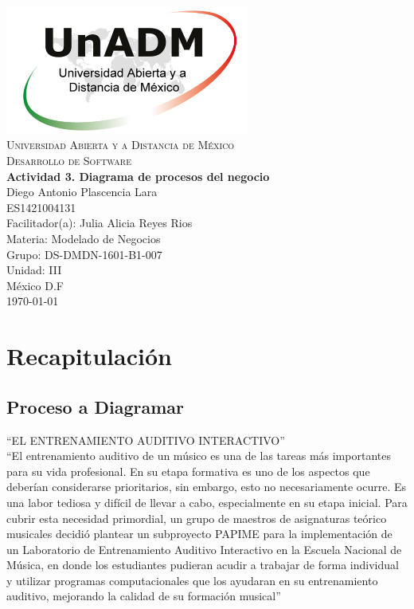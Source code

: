 \documentclass[spanish,12pt,letterpapper]{article}
\begin{document}
	\begin{titlepage}
		\begin{center}
			\includegraphics[width=0.6\textwidth]{../logoUnADM}~\\[1cm] 
			\textsc{Universidad Abierta y a Distancia de México}\\[0.8cm]
			\textsc{Desarrollo de Software}\\[1.8cm]
			
			\textbf{ \Large Actividad 3. Diagrama de procesos del negocio}\\[3cm]
			
			Diego Antonio Plascencia Lara\\ ES1421004131 \\[0.4cm]
			Facilitador(a): Julia Alicia Reyes Rios\\
			Materia: Modelado de Negocios\\
			Grupo: DS-DMDN-1601-B1-007 \\
			Unidad: III \\
			
			\vfill México D.F\\{\today}
			
		\end{center}
	\end{titlepage}
	
	\section{Recapitulación}
	\subsection{Proceso a Diagramar}
	
	``EL ENTRENAMIENTO AUDITIVO INTERACTIVO''\\
	
	``El entrenamiento auditivo de un músico es una de las tareas más importantes para su vida profesional. En su etapa formativa es uno de los aspectos que deberían considerarse prioritarios, sin embargo, esto no necesariamente ocurre. Es una labor tediosa y difícil de llevar a cabo, especialmente en su etapa inicial. Para cubrir esta necesidad primordial, un grupo de maestros de asignaturas teórico musicales decidió plantear un subproyecto PAPIME para la implementación de un Laboratorio de Entrenamiento Auditivo Interactivo en la Escuela Nacional de Música, en donde los estudiantes pudieran acudir a trabajar de forma individual y utilizar programas computacionales que los ayudaran en su entrenamiento auditivo, mejorando la calidad de su formación musical''
	
\end{document}
